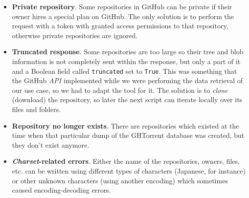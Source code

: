\documentclass[a4paper, 12pt]{book}
\begin{document}
\begin{itemize}
  \item \textbf{Private repository}. Some repositories in GitHub can be private if their owner hires a special
  plan on GitHub. The only solution is to perform the request with
  a token with granted access permissions to that repository, otherwise private repositories are ignored.
  \item \textbf{Truncated response}. Some repositories are too large so their tree and blob information is not completely
  sent within the response, but only a part of it and a Boolean field called \texttt{truncated} set to \texttt{True}.
  This was something that the GitHub \textit{API} implemented while we were performing the data retrieval of our
  use case, so we had to adapt the tool for it. The solution is to \textit{clone} (download) the repository,
  so later the next script can iterate locally over its files and folders.
  \item \textbf{Repository no longer exists}. There are repositories which existed at the time when that particular
  dump of the GHTorrent database was created, but they don't exist anymore.
  \item \textbf{\textit{Charset}-related errors}. Either the name of the repositories, owners, files, etc. can be written
  using different types of characters (Japanese, for instance) or other unknown characters (using another encoding)
  which sometimes caused encoding-decoding errors.
\end{itemize}
\end{document}
